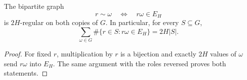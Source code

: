 \begin{proposition}
\label{prop:biregular}
The bipartite graph
\[
 r\sim\omega
 \quad\Longleftrightarrow\quad
 r\omega\in E_H
\]
is \(2H\)-regular on both copies of \(G\).  In particular, for every
\(S\subseteq G\),
\[
 \sum_{\omega\in G}
 \#\{r\in S:r\omega\in E_H\}
 =2H|S|.
\]
\end{proposition}

\begin{proof}
For fixed \(r\), multiplication by \(r\) is a bijection and exactly
\(2H\) values of \(\omega\) send \(r\omega\) into \(E_H\).  The same
argument with the roles reversed proves both statements.
\end{proof}
